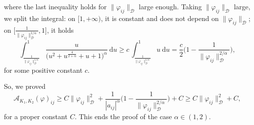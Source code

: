 \documentclass[a4paper,10pt]{amsart}
\newcommand{\ud}{\mathrm{d}}
\theoremstyle{plain}
\theoremstyle{definition}
\numberwithin{equation}{section}
\numberwithin{thm}{section}
\begin{document}
where the last inequality holds for $\|\varphi_{ij}\|_\mathcal{D}$ large enough. Taking $\|\varphi_{ij}\|_\mathcal{D}$ large, we split the integral: on $[1,+\infty)$, it is constant and does not depend on $\|\varphi_{ij}\|_\mathcal{D}$; on $\bigg[\frac{1}{\|\varphi_{ij}\|_\mathcal{D}^{1/\alpha}},1\bigg]$, it holds
\[
\int_{\frac{1}{\|\varphi_{ij}\|_\mathcal{D}^{1/\alpha}}}^{1} \frac{u}{\bigg(u^2 + u^{\frac{4}{2+\alpha}}+u+1\bigg)^\alpha}\ \ud u \ge c\, \int_{\frac{1}{\|\varphi_{ij}\|_\mathcal{D}^{1/\alpha}}}^{1} u\ \ud u = \frac{c}{2}\bigg(1 - \frac{1}{\|\varphi_{ij}\|_\mathcal{D}^{2/\alpha}}\bigg),
\]
for some positive constant $c$.

So, we proved
\[
\mathcal{A}_{K_1,K_2}(\varphi)_{ij} \ge C\|\varphi_{ij}\|_{\mathcal{D}}^2 + \frac{1}{|a_{ij}|^\alpha}\bigg(1 - \frac{1}{\|\varphi_{ij}\|_\mathcal{D}^{2/\alpha}}\bigg) + C \ge C\|\varphi_{ij}\|_{\mathcal{D}}^2+ C,
\]
for a proper constant $C$. This ends the proof of the case $\alpha\in (1,2)$.
\end{document}
